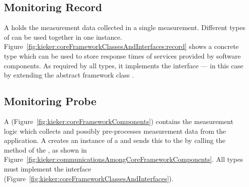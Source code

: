 


\subsection{Monitoring Record}\label{sec:architecture:record}

\noindent A \MonitoringRecord{} holds the measurement data collected in a single measurement. %
Different types of \MonitoringRecords{} can be used together in one \KiekerTpmon{} %
instance. %
Figure~\ref{fig:kieker:coreFrameworkClassesAndInterfaces:record} shows a %
concrete \MonitoringRecord{} type  which can be used %
to store response times of services provided by software components. %
As required by all \MonitoringRecord{} types, it implements the interface ---%
in this case by extending the abstract framework class . %

\subsection{Monitoring Probe}\label{sec:monitoringProbe}
% 
% 
\noindent A \MonitoringProbe{} (Figure~\ref{fig:kieker:coreFrameworkComponents}) contains the measurement logic which collects and possibly %
pre-processes measurement data from the application. %
A \MonitoringProbe{} creates an instance of a \MonitoringRecord{} and sends this %
\MonitoringRecord{} to the \TpmonController{} by calling the
method  of the \TpmonController{}, as shown in %
Figure~\ref{fig:kieker:communicationsAmongCoreFrameworkComponents}. %
All \MonitoringProbe{} types must implement the interface  (Figure~\ref{fig:kieker:coreFrameworkClassesAndInterfaces}). %

